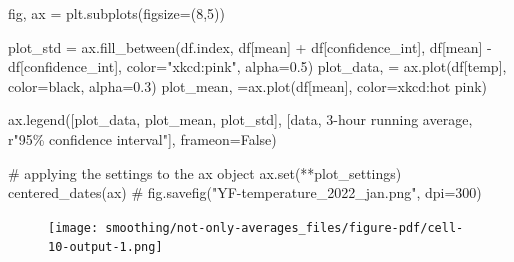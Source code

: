 \documentclass[
  letterpaper,
  DIV=11,
  numbers=noendperiod,
  oneside]{scrreprt}
\newenvironment{Shaded}{\begin{snugshade}}{\end{snugshade}}
\newcommand{\BuiltInTok}[1]{\textcolor[rgb]{0.00,0.23,0.31}{#1}}
\newcommand{\CommentTok}[1]{\textcolor[rgb]{0.37,0.37,0.37}{#1}}
\newcommand{\DecValTok}[1]{\textcolor[rgb]{0.68,0.00,0.00}{#1}}
\newcommand{\FloatTok}[1]{\textcolor[rgb]{0.68,0.00,0.00}{#1}}
\newcommand{\NormalTok}[1]{\textcolor[rgb]{0.00,0.23,0.31}{#1}}
\newcommand{\OperatorTok}[1]{\textcolor[rgb]{0.37,0.37,0.37}{#1}}
\newcommand{\SpecialCharTok}[1]{\textcolor[rgb]{0.37,0.37,0.37}{#1}}
\newcommand{\StringTok}[1]{\textcolor[rgb]{0.13,0.47,0.30}{#1}}
\newcommand{\VariableTok}[1]{\textcolor[rgb]{0.07,0.07,0.07}{#1}}
\newcommand{\VerbatimStringTok}[1]{\textcolor[rgb]{0.13,0.47,0.30}{#1}}
\begin{document}
\begin{Shaded}
\begin{Highlighting}[]
\NormalTok{fig, ax }\OperatorTok{=}\NormalTok{ plt.subplots(figsize}\OperatorTok{=}\NormalTok{(}\DecValTok{8}\NormalTok{,}\DecValTok{5}\NormalTok{))}

\NormalTok{plot\_std }\OperatorTok{=}\NormalTok{ ax.fill\_between(df.index,}
\NormalTok{                            df[}\StringTok{\textquotesingle{}mean\textquotesingle{}}\NormalTok{] }\OperatorTok{+}\NormalTok{ df[}\StringTok{\textquotesingle{}confidence\_int\textquotesingle{}}\NormalTok{],}
\NormalTok{                            df[}\StringTok{\textquotesingle{}mean\textquotesingle{}}\NormalTok{] }\OperatorTok{{-}}\NormalTok{ df[}\StringTok{\textquotesingle{}confidence\_int\textquotesingle{}}\NormalTok{],}
\NormalTok{                            color}\OperatorTok{=}\StringTok{"xkcd:pink"}\NormalTok{, alpha}\OperatorTok{=}\FloatTok{0.5}\NormalTok{)}
\NormalTok{plot\_data, }\OperatorTok{=}\NormalTok{ ax.plot(df[}\StringTok{\textquotesingle{}temp\textquotesingle{}}\NormalTok{], color}\OperatorTok{=}\StringTok{\textquotesingle{}black\textquotesingle{}}\NormalTok{, alpha}\OperatorTok{=}\FloatTok{0.3}\NormalTok{)}
\NormalTok{plot\_mean, }\OperatorTok{=}\NormalTok{ax.plot(df[}\StringTok{\textquotesingle{}mean\textquotesingle{}}\NormalTok{], color}\OperatorTok{=}\StringTok{\textquotesingle{}xkcd:hot pink\textquotesingle{}}\NormalTok{)}

\NormalTok{ax.legend([plot\_data, plot\_mean, plot\_std],}
\NormalTok{          [}\StringTok{\textquotesingle{}data\textquotesingle{}}\NormalTok{, }\StringTok{\textquotesingle{}3{-}hour running average\textquotesingle{}}\NormalTok{, }\VerbatimStringTok{r"95}\SpecialCharTok{\% c}\VerbatimStringTok{onfidence interval"}\NormalTok{],}
\NormalTok{          frameon}\OperatorTok{=}\VariableTok{False}\NormalTok{)}

\CommentTok{\# applying the settings to the ax object}
\NormalTok{ax.}\BuiltInTok{set}\NormalTok{(}\OperatorTok{**}\NormalTok{plot\_settings)}
\NormalTok{centered\_dates(ax)}
\CommentTok{\# fig.savefig("YF{-}temperature\_2022\_jan.png", dpi=300)}
\end{Highlighting}
\end{Shaded}

\begin{figure}[H]

{\centering \texttt{[image: smoothing/not-only-averages\_files/figure-pdf/cell-10-output-1.png]}

}

\end{figure}
\end{document}
